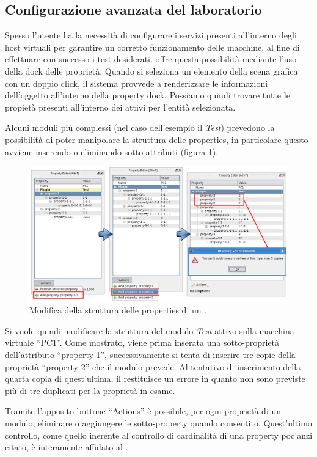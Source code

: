 \subsection{Configurazione avanzata del laboratorio}
Spesso l'utente ha la necessità di configurare i servizi presenti all'interno degli host virtuali per garantire un corretto funzionamento delle macchine, al fine di effettuare con successo i test desiderati. \visualnetkit{} offre questa possibilità mediante l'uso della dock delle proprietà.
Quando si seleziona un elemento della scena grafica con un doppio click, il sistema provvede a renderizzare le informazioni dell'oggetto all'interno della property dock. Possiamo quindi trovare tutte le propietà presenti all'interno dei \plugin{} attivi per l'entità selezionata.

Alcuni moduli più complessi (nel caso dell'esempio il \plugin{} \emph{Test}) prevedono la possibilità di poter manipolare la struttura delle properties, in particolare questo avviene inserendo o eliminando sotto-attributi (figura \ref{figura:vn_ex_pp}).

\begin{figure}[!htb]
	\centering
	\includegraphics[width=13cm]{images/vnetkit_property_evolution.png}
	\caption{Modifica della struttura delle properties di un \plugin{}.}
	\label{figura:vn_ex_pp}
\end{figure}
Si vuole quindi modificare la struttura del modulo \emph{Test} attivo sulla macchina virtuale ``PC1''. Come mostrato, viene prima inserata una sotto-proprietà dell'attributo ``property-1'', successivamente si tenta di inserire tre copie della proprietà ``property-2'' che il modulo prevede.
Al tentativo di inserimento della quarta copia di quest'ultima, il \plugin{} restituisce un errore in quanto non sono previste più di tre duplicati per la proprietà in esame.

Tramite l'apposito bottone ``Actions'' è possibile, per ogni proprietà di un modulo, eliminare o aggiungere le sotto-property quando consentito. Quest'ultimo controllo, come quello inerente al controllo di cardinalità di una property poc'anzi citato, è interamente affidato al \plugin{}.

